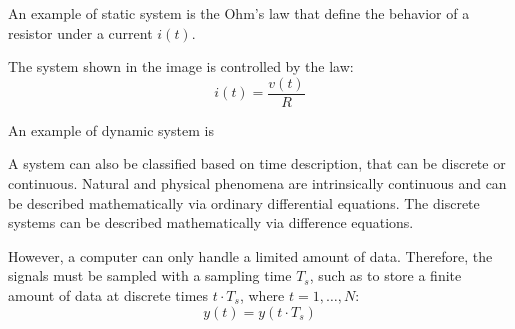 \begin{example}
    An example of static system is the Ohm's law that define the behavior of a resistor under a current $i(t)$. 

    The system shown in the image is controlled by the law: 
    \[i(t)=\dfrac{v(t)}{R}\]

    An example of dynamic system is 
\end{example}

A system can also be classified based on time description, that can be discrete or continuous. 
Natural and physical phenomena are intrinsically continuous and can be described mathematically via ordinary differential equations. 
The discrete systems can be described mathematically via difference equations. 





However, a computer can only handle a limited amount of data. 
Therefore, the signals must be sampled with a sampling time $T_s$, such as to store a finite amount of data at discrete times $t \cdot T_s$, where $t=1,\dots,N$: 
\[y(t)=y(t \cdot T_s)\]


